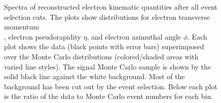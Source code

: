 \begin{figure}[htb]
\begin{center}
  \end{center}
   \caption[\fixspacing Reconstructed electron \pt, $\eta$, $\phi$ spectra after full selection]{
   \fixspacing Spectra of reconstructed electron kinematic quantities after all event selection cuts. 
   The plots show distributions for 
    electron transverse momentum \\ \pt, 
    electron pseudorapidity $\eta$, and 
    electron azimuthal angle $\phi$. %
   Each plot shows the data (black points with error bars) superimposed over the Monte Carlo 
   distributions (colored/shaded areas with varied line styles).  
   The signal Monte Carlo sample is shown by the solid black line against the white background.  
   Most of the background has been cut out by the event selection.  
   Below each plot is the ratio of the data to Monte Carlo event numbers for each bin.  
  }
  \label{fig:RecoSpectraAfterEid}
 \end{figure}



